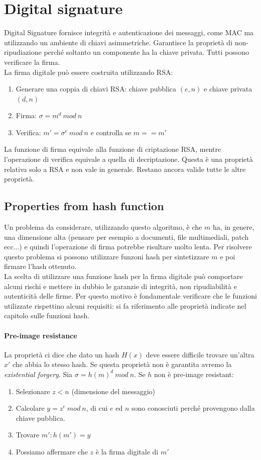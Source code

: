 \documentclass[a4paper,12pt]{article}
\begin{document}
\newpage

\section{Digital signature}
Digital Signature fornisce integrità e autenticazione dei messaggi, come MAC ma utilizzando un ambiente di chiavi asimmetriche. Garantisce la proprietà di non-ripudiazione perché soltanto un componente ha la chiave privata.
Tutti possono verificare la firma. \\
La firma digitale può essere costruita utilizzando RSA:
\begin{enumerate}
	\item Generare una coppia di chiavi RSA: chiave pubblica $(e,n)$ e chiave privata $(d,n)$
	\item Firma: $\sigma = m^d\ mod\ n$
	\item Verifica: $m' = \sigma^e\ mod\ n$ e controlla se $m == m'$
\end{enumerate}
La funzione di firma equivale alla funzione di criptazione RSA, mentre l'operazione di verifica equivale a quella di decriptazione.
Questa è una proprietà relativa solo a RSA e non vale in generale. Restano ancora valide tutte le altre proprietà.

\subsection{Properties from hash function}
Un problema da considerare, utilizzando questo algoritmo, è che $m$ ha, in genere, una dimensione alta (pensare per esempio a documenti, file multimediali, patch ecc...)
e quindi l'operazione di firma potrebbe risultare molto lenta. Per risolvere questo problema si possono utilizzare funzoni hash per sintetizzare $m$ e poi firmare l'hash ottenuto. \\
La scelta di utilizzare una funzione hash per la firma digitale può comportare alcuni rischi e mettere in dubbio le garanzie di integrità, non ripudiabilità e autenticità delle firme.
Per questo motivo è fondamentale verificare che le funzioni utilizzate rispettino alcuni requisiti:
si fa riferimento alle proprietà indicate nel capitolo sulle funzioni hash.
\paragraph{Pre-image resistance}
La proprietà ci dice che dato un hash $H(x)$ deve essere difficile trovare un'altra $x'$ che abbia lo stesso hash.
Se questa proprietà non è garantita avremo la \textit{existential forgery}.
Sia $\sigma = h(m)^d\ mod\ n$. Se $h$ non è pre-image resistant:
\begin{enumerate}
	\item Selezionare $z < n$ (dimensione del messaggio)
	\item Calcolare $y = z^e\ mod\ n$, di cui $e$ ed $n$ sono conosciuti perché provengono dalla chiave pubblica.
	\item Trovare $m' : h(m') = y$
	\item Possiamo affermare che $z$ è la firma digitale di $m'$
\end{enumerate}
\end{document}
